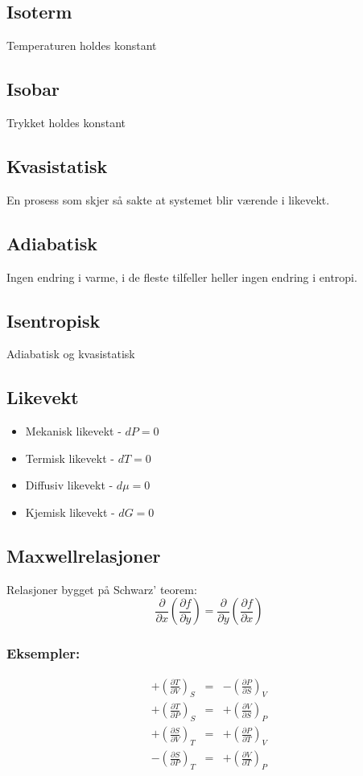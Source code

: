 \documentclass{article}
\begin{document}
\begin{multicols}{2}
\subsection*{Isoterm}
Temperaturen holdes konstant
\subsection*{Isobar}
Trykket holdes konstant
\subsection*{Kvasistatisk}
En prosess som skjer så sakte at systemet blir værende i likevekt.
\subsection*{Adiabatisk}
Ingen endring i varme, i de fleste tilfeller heller ingen endring i entropi.
\subsection*{Isentropisk}
Adiabatisk og kvasistatisk
\subsection*{Likevekt}
\begin{itemize}
\item Mekanisk likevekt - $dP=0$
\item Termisk likevekt - $dT=0$
\item Diffusiv likevekt - $d\mu=0$
\item Kjemisk likevekt - $dG=0$
\end{itemize}
\columnbreak
\subsection*{Maxwellrelasjoner}
Relasjoner bygget på Schwarz' teorem:
\begin{equation*}
{\frac {\partial }{\partial x}}\left({\frac {\partial f}{\partial y}}\right)={\frac {\partial }{\partial y}}\left({\frac {\partial f}{\partial x}}\right)
\end{equation*}

\subsubsection*{Eksempler:}
$$\begin{aligned}+\left({\frac  {\partial T}{\partial V}}\right)_{S}&=&-\left({\frac  {\partial P}{\partial S}}\right)_{V}\\
+\left({\frac  {\partial T}{\partial P}}\right)_{S}&=&+\left({\frac  {\partial V}{\partial S}}\right)_{P}\\
+\left({\frac  {\partial S}{\partial V}}\right)_{T}&=&+\left({\frac  {\partial P}{\partial T}}\right)_{V}\\
-\left({\frac  {\partial S}{\partial P}}\right)_{T}&=&+\left({\frac  {\partial V}{\partial T}}\right)_{P}\end{aligned}$$


\end{multicols}
\end{document}
